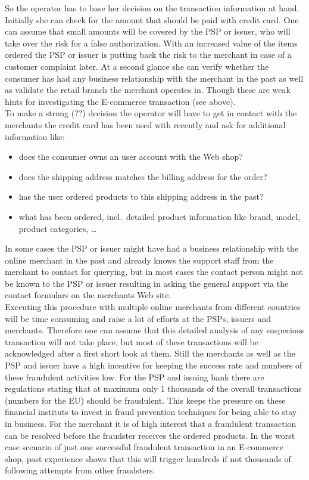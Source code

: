 So the operator has to base her decision on the transaction information at hand. Initially she can check for the amount that should be paid with credit card. One can assume that small amounts will be covered by the \gls{PSP} or issuer, who will take over the risk for a false authorization. With an increased value of the items ordered the \gls{PSP} or issuer is putting back the risk to the merchant in case of a customer complaint later. At a second glance she can verify whether the consumer has had any business relationship with the merchant in the past as well as validate the retail branch the merchant operates in. Though these are weak hints for investigating the E-commerce transaction (see above). \\

To make a strong (??) decision the operator will have to get in contact with the merchants the credit card has been used with recently and ask for additional information like:\@

\begin{itemize}
  \item does the consumer owns an user account with the Web shop?
  \item does the shipping address matches the billing address for the order?
  \item has the user ordered products to this shipping address in the past?
  \item what has been ordered, incl.\ detailed product information like brand, model, product categories, \ldots
\end{itemize}

In some cases the \gls{PSP} or issuer might have had a business relationship with the online merchant in the past and already knows the support staff from the merchant to contact for querying, but in most cases the contact person might not be known to the \gls{PSP} or issuer resulting in asking the general support via the contact formulars on the merchants Web site. \\

Executing this procedure with multiple online merchants from different countries will be time consuming and raise a lot of efforts at the \gls{PSP}s, issuers and merchants. Therefore one can assume that this detailed analysis of any suspecious transaction will not take place, but most of these transactions will be acknowledged after a first short look at them. Still the merchants as well as the \gls{PSP} and issuer have a high incentive for keeping the success rate and numbers of these fraudulent activities low. For the \gls{PSP} and issuing bank there are regulations stating that at maximum only 1 thousands of the overall transactions (numbers for the EU) should be fraudulent. This keeps the pressure on these financial instituts to invest in fraud prevention techniques for being able to stay in business. For the merchant it is of high interest that a fraudulent transaction can be resolved before the fraudster receives the ordered products. In the worst case scenario of just one successful fraudulent transaction in an E-commerce shop, past experience shows that this will trigger hundreds if not thousands of following attempts from other fraudsters. \\



